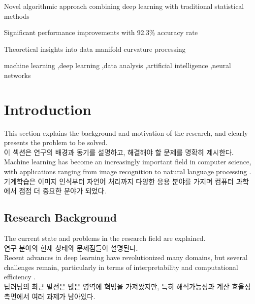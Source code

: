 \documentclass[preprint,12pt]{elsarticle}
\begin{document}
\begin{frontmatter}
\begin{highlights}
\item Novel algorithmic approach combining deep learning with traditional statistical methods
\item Significant performance improvements with 92.3\% accuracy rate
\item Theoretical insights into data manifold curvature processing
\end{highlights}

\begin{keyword}
machine learning \sep deep learning \sep data analysis \sep artificial intelligence \sep neural networks
\end{keyword}

\end{frontmatter}

\section{Introduction}
\label{sec:introduction}

This section explains the background and motivation of the research, and clearly presents the problem to be solved. \\
이 섹션은 연구의 배경과 동기를 설명하고, 해결해야 할 문제를 명확히 제시한다. \\

Machine learning has become an increasingly important field in computer science, with applications ranging from image recognition to natural language processing \cite{bishop2006pattern}. \\
기계학습은 이미지 인식부터 자연어 처리까지 다양한 응용 분야를 가지며 컴퓨터 과학에서 점점 더 중요한 분야가 되었다. \\

\subsection{Research Background}
The current state and problems in the research field are explained. \\
연구 분야의 현재 상태와 문제점들이 설명된다. \\

Recent advances in deep learning have revolutionized many domains, but several challenges remain, particularly in terms of interpretability and computational efficiency \cite{hinton2006fast}. \\
딥러닝의 최근 발전은 많은 영역에 혁명을 가져왔지만, 특히 해석가능성과 계산 효율성 측면에서 여러 과제가 남아있다. \\
\end{document}
